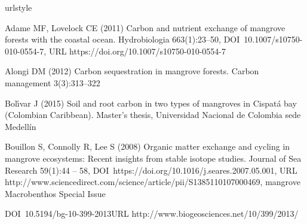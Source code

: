 %

\DIFdelbegin %

\DIFdelend \DIFaddbegin \begin{thebibliography}{29}
\DIFaddend \providecommand{\natexlab}[1]{#1}
\providecommand{\url}[1]{{#1}}
\providecommand{\urlprefix}{URL }
\expandafter\ifx\csname urlstyle\endcsname\relax
  \providecommand{\doi}[1]{DOI~\discretionary{}{}{}#1}\else
  \providecommand{\doi}{DOI~\discretionary{}{}{}\begingroup
  \urlstyle{rm}\Url}\fi
\providecommand{\eprint}[2][]{\url{#2}}

Adame MF, Lovelock CE (2011) Carbon and nutrient exchange of mangrove forests
  with the coastal ocean. Hydrobiologia 663(1):23--50,
  \doi{10.1007/s10750-010-0554-7},
  \urlprefix\url{https://doi.org/10.1007/s10750-010-0554-7}

Alongi DM (2012) Carbon sequestration in mangrove forests. Carbon management
  3(3):313--322

Bol{\'\i}var J (2015) {Soil and root carbon in two types of mangroves in
  Cispat\'a bay (Colombian Caribbean).} Master's thesis, Universidad Nacional
  de Colombia sede Medell\'in

Bouillon S, Connolly R, Lee S (2008) Organic matter exchange and cycling in
  mangrove ecosystems: Recent insights from stable isotope studies. Journal of
  Sea Research 59(1):44 -- 58,
  \doi{https://doi.org/10.1016/j.seares.2007.05.001},
  \urlprefix\url{http://www.sciencedirect.com/science/article/pii/S1385110107000469},
  mangrove Macrobenthos Special Issue

\DIFaddbegin {}
\doi{10.5194/bg-10-399-2013}\DIFadd{,
  }\urlprefix\url{http://www.biogeosciences.net/10/399/2013/}


\end{thebibliography}
